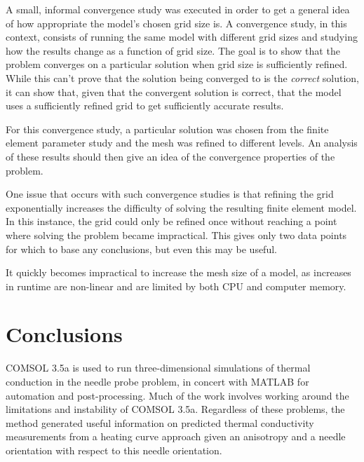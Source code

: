 A small, informal convergence study was executed in order to get a general idea
of how appropriate the model's chosen grid size is. A convergence study, in this
context, consists of running the same model with different grid sizes and
studying how the results change as a function of grid size.  The goal is to show
that the problem converges on a particular solution when grid size is
sufficiently refined. While this can't prove that the solution being converged
to is the \emph{correct} solution, it can show that, given that the convergent
solution is correct, that the model uses a sufficiently refined grid to get
sufficiently accurate results.

For this convergence study, a particular solution was chosen from the finite
element parameter study and the mesh was refined to different levels. An
analysis of these results should then give an idea of the convergence properties
of the problem.

One issue that occurs with such convergence studies is that refining the grid
exponentially increases the difficulty of solving the resulting finite element
model. In this instance, the grid could only be refined once without reaching
a point where solving the problem became impractical. This gives only two data
points for which to base any conclusions, but even this may be useful.

\begin{table}[h]
\centering

\caption{It quickly becomes impractical to increase the mesh size of a model, as
increases in runtime are non-linear and are limited by both CPU and computer memory.}
\label{tab:conv_runtime}
\end{table}

\section{Conclusions}

COMSOL 3.5a is used to run three-dimensional simulations of thermal conduction
in the needle probe problem, in concert with MATLAB for automation and
post-processing. Much of the work involves working around the limitations and
instability of COMSOL 3.5a. Regardless of these problems, the method generated
useful information on predicted thermal conductivity measurements from a heating
curve approach given an anisotropy and a needle orientation with respect to this
needle orientation.
